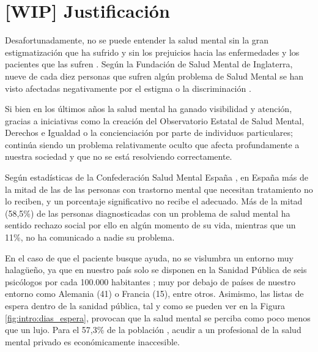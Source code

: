 \section{[WIP] Justificación}
    
    Desafortunadamente, no se puede entender la salud mental sin la gran estigmatización que ha sufrido y sin los prejuicios hacia las enfermedades y los pacientes que las sufren \cite{delgado_rompiendo_2021} \cite{andres_tallarda_combatir_2020}. Según la Fundación de Salud Mental de Inglaterra, nueve de cada diez personas que sufren algún problema de Salud Mental se han visto afectadas negativamente por el estigma o la discriminación \cite{mental_health_foundation_stigma_nodate}.

    Si bien en los últimos años la salud mental ha ganado visibilidad y atención, gracias a iniciativas como la creación del Observatorio Estatal de Salud Mental, Derechos e Igualdad \cite{comunicacion_nace_2022} o la concienciación por parte de individuos particulares; continúa siendo un problema relativamente oculto que afecta profundamente a nuestra sociedad y que no se está resolviendo correctamente. 
    
    Según estadísticas de la Confederación Salud Mental España \cite{confederacion_salud_mental_espana_salud_nodate} \cite{aguilar_laura_2022}, en España más de la mitad de las de las personas con trastorno mental que necesitan tratamiento no lo reciben, y un porcentaje significativo no recibe el adecuado. Más de la mitad (58,5\%) de las personas diagnosticadas con un problema de salud mental ha sentido rechazo social por ello en algún momento de su vida, mientras que un 11\%, no ha comunicado a nadie su problema.
    
    
    En el caso de que el paciente busque ayuda, no se vislumbra un entorno muy halagüeño, ya que en nuestro país solo se disponen en la Sanidad Pública de seis psicólogos por cada 100.000 habitantes \cite{antolin_listas_2023}; muy por debajo de países de nuestro entorno como Alemania (41) o Francia (15), entre otros. Asimismo, las listas de espera dentro de la sanidad pública, tal y como se pueden ver en la Figura \ref{fig:intro:dias_espera}, provocan que la salud mental se perciba como poco menos que un lujo. Para el 57,3\% de la población \cite{comunicacion_cuatro_2023}, acudir a un profesional de la salud mental privado es económicamente inaccesible.
    
